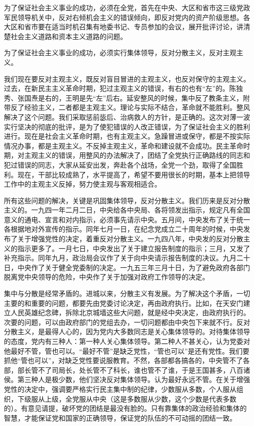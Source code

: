 为了保证社会主义事业的成功，必须在全党，首先在中央、大区和省市这三级党政军民领导机关中，反对右倾机会主义的错误倾向，即反对党内的资产阶级思想。各大区和省市要在适当时机召集有地委书记、专员参加的会议，展开批评讨论，讲清楚社会主义道路和资本主义道路的问题。

为了保证社会主义事业的成功，必须实行集体领导，反对分散主义，反对主观主义。

我们现在要反对主观主义，既反对盲目冒进的主观主义，也反对保守的主观主义。过去，在新民主主义革命时期，犯过主观主义的错误，有右的也有“左”的。陈独秀、张国焘是右的，王明是先“左”后右。延安整风的时候，集中反了教条主义，附带反了经验主义，二者都是主观主义。理论与实际不结合，革命就不能胜利。整风解决了这个问题。我们采取惩前毖后、治病救人的方针，是正确的。这次对薄一波实行坚决的彻底的批评，是为了使犯错误的人改正错误，为了保证社会主义的胜利进行。现在是社会主义革命时期，也有主观主义。急躁冒进或保守，都是不按实际情况办事，都是主观主义。不反掉主观主义，革命和建设就不会成功。民主革命时期，对主观主义的错误，用整风的办法解决了，团结了全党执行正确路线的同志和犯过错误的同志，大家从延安出发，奔赴各个战场，全党一个劲，取得了全国胜利。现在，干部比较成熟了，水平提高了，希望不要用很长的时期，基本上把领导工作中的主观主义反掉，努力使主观与客观相适合。

所有这些问题的解决，关键是巩固集体领导，反对分散主义。我们历来是反对分散主义的。一九四一年二月二日，中央给各中央局、各将领发出指示，规定凡有全国意义的通电、宣言和对内指示，必须事先请示中央。五月间，中央发布了关于统一各根据地对外宣传的指示。同年七月一日，在纪念党成立二十周年的时候，中央发布了关于增强党性的决定，着重反对分散主义。一九四八年，中央发的反对分散主义的指示更多了。一月七日，中央发出了关于建立报告制度的指示；三月，又发了补充指示。同年九月，政治局会议作了关于向中央请示报告制度的决议。九月二十日，中央作了关于健全党委制的决定。一九五三年三月十日，为了避免政府各部门脱离党中央领导的危险，中央作了关于加强对政府工作领导的决定。

集中与分散是经常矛盾的。进城以来，分散主义有发展。为了解决这个矛盾，一切主要的和重要的问题，都要先由党委讨论决定，再由政府执行。比如，在天安门建立人民英雄纪念碑，拆除北京城墙这些大问题，就是经中央决定，由政府执行的。次要的问题，可以由政府部门的党组去办，一切问题都由中央包下来就不行。反对分散主义，是最得人心的，因为党内大多数同志是关心集体领导的。对待集体领导的态度，党内有三种人：第一种人关心集体领导。第二种人不甚关心，认为党委对他最好不管，管也可以。“最好不管”是缺乏党性，“管也可以”是还有党性。我们要抓他“管也可以”，对缺乏党性要说服教育。不然，各部都各搞各的，中央管不了各部，部长管不了司局长，处长管不了科长，谁也管不了谁，于是王国甚多，八百诸侯。第三种人是极少数，他们坚决反对集体领导。认为最好永远不管。在关于增强党性的决定中，强调要严格实行民主集中制的纪律，少数服从多数，个人服从组织，下级服从上级，全党服从中央（这是多数服从少数，这个少数是代表多数的）。有意见请提，破坏党的团结是最没有脸的。只有靠集体的政治经验和集体的智慧，才能保证党和国家的正确领导，保证党的队伍的不可动摇的团结一致。

